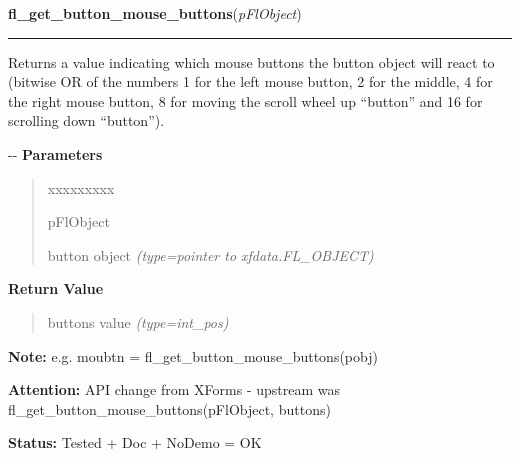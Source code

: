     \vspace{0.5ex}

\hspace{.8\funcindent}\begin{boxedminipage}{\funcwidth}

    \raggedright \textbf{fl\_get\_button\_mouse\_buttons}(\textit{pFlObject})

    \vspace{-1.5ex}

    \rule{\textwidth}{0.5\fboxrule}
\setlength{\parskip}{2ex}

Returns a value indicating which mouse buttons the button object will
react to (bitwise OR of the numbers 1 for the left mouse button, 2 for
the middle, 4 for the right mouse button, 8 for moving the scroll wheel
up ``button'' and 16 for scrolling down ``button'').

-{}-
\setlength{\parskip}{1ex}
      \textbf{Parameters}
      \vspace{-1ex}

      \begin{quote}
        \begin{Ventry}{xxxxxxxxx}

          \item[pFlObject]


button object
            {\it (type=pointer to xfdata.FL\_OBJECT)}

        \end{Ventry}

      \end{quote}

      \textbf{Return Value}
    \vspace{-1ex}

      \begin{quote}

buttons value
      {\it (type=int\_pos)}

      \end{quote}

\textbf{Note:} 
e.g. moubtn = fl\_get\_button\_mouse\_buttons(pobj)


\textbf{Attention:} 
API change from XForms - upstream was
fl\_get\_button\_mouse\_buttons(pFlObject, buttons)


\textbf{Status:} 
Tested + Doc + NoDemo = OK


    \end{boxedminipage}



